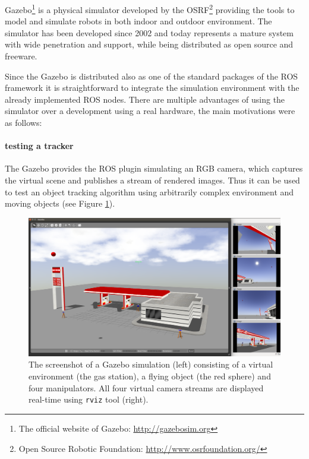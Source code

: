 	Gazebo\footnote{The official website of Gazebo: \url{http://gazebosim.org}} is a physical simulator developed by the OSRF\footnote{Open Source Robotic Foundation: \url{http://www.osrfoundation.org/}} providing the tools to model and simulate robots in both indoor and outdoor environment. The simulator has been developed since 2002 and today represents a mature system with wide penetration and support, while being distributed as open source and freeware. 
	
	Since the Gazebo is distributed also as one of the standard packages of the ROS framework it is straightforward to integrate the simulation environment with the already implemented ROS nodes. There are multiple advantages of using the simulator over a development using a real hardware, the main motivations were as follows:
	
	\paragraph{testing a tracker} The Gazebo provides the ROS plugin simulating an RGB camera, which captures the virtual scene and publishes a stream of rendered images. Thus it can be used to test an object tracking algorithm using arbitrarily complex environment and moving objects (see Figure \ref{fig:gazebo_camera_stream}).
	
	\begin{figure}[htb]
		\centering
		\includegraphics[width=14.5cm]{fig/gazebo_camera_stream.png}
		\caption{The screenshot of a Gazebo simulation (left) consisting of a virtual environment (the gas station), a flying object (the red sphere) and four manipulators. All four virtual camera streams are displayed real-time using \texttt{rviz} tool (right).}
		\label{fig:gazebo_camera_stream}
	\end{figure}
	
